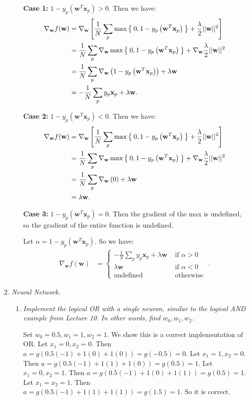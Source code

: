\documentclass[12pt,oneside,reqno]{amsart}
\theoremstyle{plain}
\theoremstyle{definition}
\theoremstyle{remark}
\newcommand{\vecc}{\mathbf}
\newcommand{\bee}{\begin{equation}\begin{aligned}}
\newcommand{\eee}{\end{aligned}\end{equation}}
\newcommand{\fracc}{\frac}
\newcommand{\lpar}{\left(}
\newcommand{\rpar}{\right)}
\begin{document}
\begin{enumerate}[label=\arabic*.]
\begin{enumerate}
\textbf{Case 1:} $1 - y_p\lpar \vecc{w}^T\vecc{x}_p \rpar > 0$. Then we have:
\bee
\nabla_{\vecc{w}}f(\vecc{w}) &= \nabla_{\vecc{w}}\left[\fracc{1}{N}\sum_p\max\Set{0,1 - y_p\lpar \vecc{w}^T\vecc{x}_p \rpar } + \fracc{\lambda}{2}||\vecc{w}||^2\right]\\
&= \fracc{1}{N}\sum_p\nabla_{\vecc{w}}\max\Set{0,1 - y_p\lpar \vecc{w}^T\vecc{x}_p \rpar } + \nabla_{\vecc{w}}\fracc{\lambda}{2}||\vecc{w}||^2\\
&= \fracc{1}{N}\sum_p \nabla_{\vecc{w}}\lpar 1 - y_p\lpar \vecc{w}^T\vecc{x}_p \rpar\rpar + \lambda\vecc{w}\\
&= -\fracc{1}{N}\sum_p y_p\vecc{x}_p + \lambda\vecc{w}.
\eee

\textbf{Case 2:} $1 - y_p\lpar \vecc{w}^T\vecc{x}_p \rpar < 0$. Then we have:
\bee
\nabla_{\vecc{w}}f(\vecc{w}) &= \nabla_{\vecc{w}}\left[\fracc{1}{N}\sum_p\max\Set{0,1 - y_p\lpar \vecc{w}^T\vecc{x}_p \rpar } + \fracc{\lambda}{2}||\vecc{w}||^2\right]\\
&= \fracc{1}{N}\sum_p\nabla_{\vecc{w}}\max\Set{0,1 - y_p\lpar \vecc{w}^T\vecc{x}_p \rpar } + \nabla_{\vecc{w}}\fracc{\lambda}{2}||\vecc{w}||^2\\
&= \fracc{1}{N}\sum_p \nabla_{\vecc{w}}\lpar 0\rpar + \lambda\vecc{w}\\
&= \lambda\vecc{w}.
\eee

\textbf{Case 3:} $1 - y_p\lpar \vecc{w}^T\vecc{x}_p \rpar = 0$. Then the gradient of the max is undefined, so the gradient of the entire function is undefined. 


Let $\alpha = 1 - y_p\lpar \vecc{w}^T\vecc{x}_p \rpar$. So we have:
\bee
\nabla_{\vecc{w}}f(\vecc{w}) &= 
\begin{cases}
-\fracc{1}{N}\sum_p y_p\vecc{x}_p + \lambda\vecc{w} & \text{ if }\alpha > 0\\
\lambda\vecc{w} & \text{ if }\alpha < 0\\
\text{undefined} & \text{ otherwise }
\end{cases}.
\eee
 \end{enumerate}

\item \textit{Neural Network. }

\begin{enumerate}
\item \textit{Implement the logical OR with a single neuron, similar to the logical AND example from Lecture 10. In other words, find $w_0,w_1,w_2$. }

Set $w_0 = 0.5,w_1 = 1,w_2 = 1$. We show this is a correct implementation of OR. Let $x_1 = 0,x_2 = 0$. Then $a = g(0.5(-1) + 1(0) + 1(0)) = g(-0.5) = 0$. Let $x_1 = 1,x_2 = 0$. Then $a = g(0.5(-1) + 1(1) + 1(0)) = g(0.5) = 1$. Let $x_1 = 0,x_2 = 1$. Then $a = g(0.5(-1) + 1(0) + 1(1)) = g(0.5) = 1$. Let $x_1 = x_2 = 1$. Then $a = g(0.5(-1) + 1(1) + 1(1)) = g(1.5) = 1$. So it is correct. 


\end{enumerate}
\end{enumerate}
\end{document}
